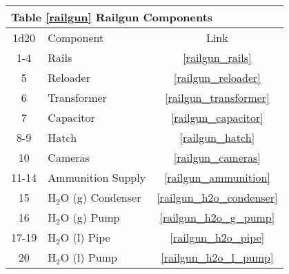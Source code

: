 \documentclass[a4paper]{article}
\begin{document}
\vspace{0.5cm} \hspace{0.25\linewidth}
\begin{tabular}{@{} | c | l | c | @{}}
\toprule
\multicolumn{3}{|l|}{Table \ref{railgun} Railgun Components} \\
\toprule
1d20 & Component & Link \\
\midrule
1-4 & Rails & \ref{railgun_rails} \\
5 & Reloader & \ref{railgun_reloader} \\
6 & Transformer & \ref{railgun_transformer} \\
7 & Capacitor & \ref{railgun_capacitor} \\
8-9 & Hatch & \ref{railgun_hatch} \\
10 & Cameras & \ref{railgun_cameras} \\
11-14 & Ammunition Supply & \ref{railgun_ammunition} \\
\midrule
15 & H$_2$O (g) Condenser & \ref{railgun_h2o_condenser} \\
16 & H$_2$O (g) Pump & \ref{railgun_h2o_g_pump} \\
17-19 & H$_2$O (l) Pipe & \ref{railgun_h2o_pipe} \\
20 & H$_2$O (l) Pump & \ref{railgun_h2o_l_pump} \\
\bottomrule
\end{tabular}
\end{document}
